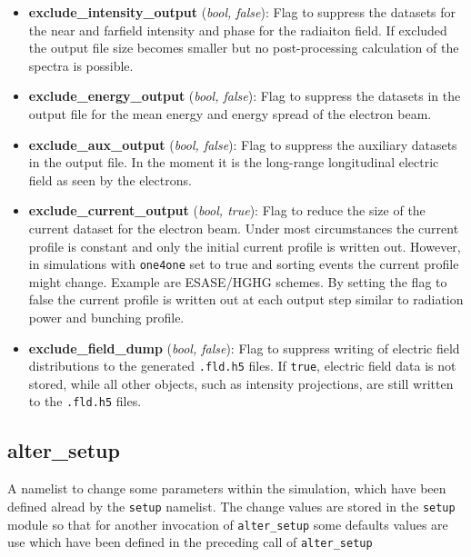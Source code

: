 \documentclass[12pt]{book}
\begin{document}
\begin{itemize}
\item {\bf exclude\_intensity\_output} ({\it bool, false}): Flag to suppress the datasets for the near and farfield intensity and phase for the radiaiton field. If excluded the output file size becomes smaller but no post-processing calculation of the spectra is possible.

\item {\bf exclude\_energy\_output} ({\it bool, false}): Flag to suppress the datasets in the output file for the mean energy and energy spread of the electron beam.

\item {\bf exclude\_aux\_output} ({\it bool, false}): Flag to suppress the auxiliary datasets in the output file. In the moment it is the long-range longitudinal electric field as seen by the electrons.


\item {\bf exclude\_current\_output} ({\it bool, true}): Flag to reduce the size of the current dataset for the electron beam. Under most circumstances the current profile is constant and only the initial current profile is written out. However, in simulations with {\tt one4one} set to true and sorting events the current profile might change. Example are ESASE/HGHG schemes. By setting the flag to false the current profile is written out at each output step similar to radiation power and bunching profile.

\item {\bf exclude\_field\_dump} ({\it bool, false}): Flag to suppress writing of electric field distributions to the generated {\tt .fld.h5} files. If {\tt true}, electric field data is not stored, while all other objects, such as intensity projections, are still written to the {\tt .fld.h5} files.




\end{itemize}

\subsection{\sf alter\_setup}

A namelist to change some parameters within the simulation, which have been defined alread by the {\tt setup} namelist. The change values are stored in the {\tt setup} module so that for another invocation of {\tt alter\_setup} some defaults values are use which have been defined in the preceding call of {\tt alter\_setup}
\end{document}
